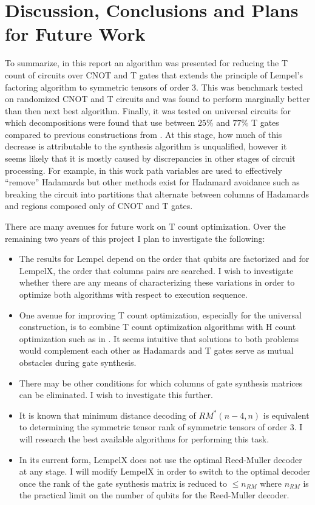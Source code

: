 \documentclass{article}
\theoremstyle{definition}
\theoremstyle{problem}
\theoremstyle{lemma}
\begin{document}
			\FloatBarrier
			\section{Discussion, Conclusions and Plans for Future Work}
			\label{s6_Discussion}
			
			To summarize, in this report an algorithm was presented for reducing the T count of circuits over CNOT and T gates that extends the principle of Lempel's factoring algorithm to symmetric tensors of order 3. This was benchmark tested on randomized CNOT and T circuits and was found to perform marginally better than then next best algorithm. Finally, it was tested on universal circuits for which decompositions were found that use between $25\%$ and $77\%$ T gates compared to previous constructions from \cite{8_Amy_2016}. At this stage, how much of this decrease is attributable to the synthesis algorithm is unqualified, however it seems likely that it is mostly caused by discrepancies in other stages of circuit processing. For example, in this work path variables are used to effectively ``remove'' Hadamards but other methods exist for Hadamard avoidance such as breaking the circuit into partitions that alternate between columns of Hadamards and regions composed only of CNOT and T gates.
			
			There are many avenues for future work on T count optimization. Over the remaining two years of this project I plan to investigate the following:			
			\begin{itemize}
				\item The results for Lempel depend on the order that qubits are factorized and for LempelX, the order that columns pairs are searched. I wish to investigate whether there are any means of characterizing these variations in order to optimize both algorithms with respect to execution sequence.
				\item One avenue for improving T count optimization, especially for the universal construction, is to combine T count optimization algorithms with H count optimization such as in \cite{Abdessaied2014}. It seems intuitive that solutions to both problems would complement each other as Hadamards and T gates serve as mutual obstacles during gate synthesis.
				\item There may be other conditions for which columns of gate synthesis matrices can be eliminated. I wish to investigate this further.
				\item It is known that minimum distance decoding of $RM^*(n-4,n)$ is equivalent to determining the symmetric tensor rank of symmetric tensors of order 3. I will research the best available algorithms for performing this task.
				\item In its current form, LempelX does not use the optimal Reed-Muller decoder at any stage. I will modify LempelX in order to switch to the optimal decoder once the rank of the gate synthesis matrix is reduced to $\leq n_{RM}$ where $n_{RM}$ is the practical limit on the number of qubits for the Reed-Muller decoder.
			\end{itemize}
			
\end{document}
